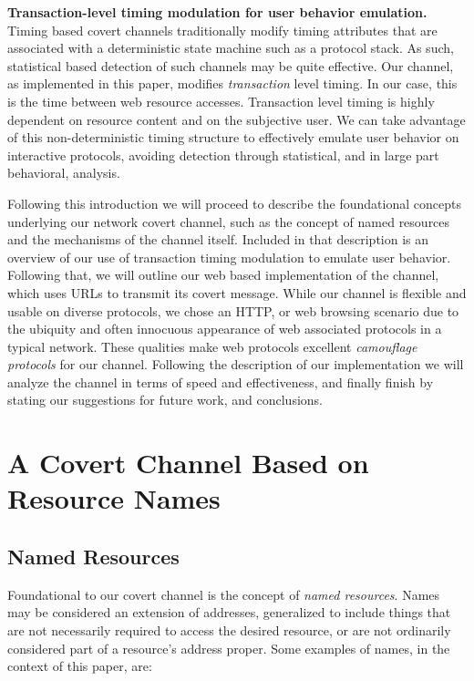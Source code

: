 \documentclass[10pt, conference]{IEEEtran}
\begin{document}
{\bf Transaction-level timing modulation for user behavior emulation.}
Timing based covert channels traditionally modify timing attributes that are associated with a deterministic state machine such as a protocol stack.  As such, statistical based detection of such channels may be quite effective.  Our channel, as implemented in this paper, modifies {\em transaction} level timing.  In our case, this is the time between web resource accesses.  Transaction level timing is highly dependent on resource content and on the subjective user.  We can take advantage of this non-deterministic timing structure to effectively emulate user behavior on interactive protocols, avoiding detection through statistical, and in large part behavioral, analysis.

Following this introduction we will proceed to describe the foundational concepts underlying our network covert channel, such as the concept of named resources and the mechanisms of the channel itself.  Included in that description is an overview of our use of transaction timing modulation to emulate user behavior.  Following that, we will outline our web based implementation of the channel, which uses URLs to transmit its covert message.  While our channel is flexible and usable on diverse protocols, we chose an HTTP, or web browsing scenario due to the ubiquity and often innocuous appearance of web associated protocols in a typical network.  These qualities make web protocols excellent {\em camouflage protocols} for our channel.  Following the description of our implementation we will analyze the channel in terms of speed and effectiveness, and finally finish by stating our suggestions for future work, and conclusions.

\section{A Covert Channel Based on Resource Names}

\subsection{Named Resources}
Foundational to our covert channel is the concept of {\em named resources}.  Names may be considered an extension of addresses, generalized to include things that are not necessarily required to access the desired resource, or are not ordinarily considered part of a resource's address proper.  Some examples of names, in the context of this paper, are:
\end{document}
